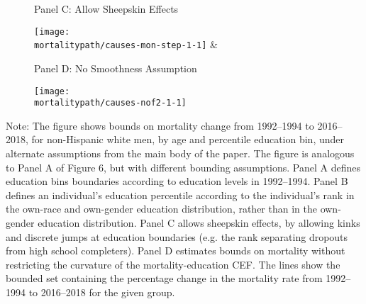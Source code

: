 \documentclass[12pt,letterpaper]{article}
\begin{document}
\begin{figure}[H]
  \begin{center}
    \vspace{-.6cm}
    Panel C: Allow Sheepskin Effects
  \end{center}
  \begin{center}
    \texttt{[image: \\mortalitypath/causes-mon-step-1-1]} &
  \end{center}
  \begin{center}
    \vspace{-.6cm}
    Panel D: No Smoothness Assumption
  \end{center}
  \begin{center}
    \texttt{[image: \\mortalitypath/causes-nof2-1-1]} \\
  \end{center}
\end{figure}
\vspace{-1cm}
\tiny{Note: The figure shows bounds on mortality change from 1992--1994 to 2016--2018, for non-Hispanic white men, by age and percentile education bin, under alternate assumptions from the main body of the paper. The figure is analogous to Panel A of Figure 6, but with different bounding assumptions. Panel A defines education bins boundaries according to education levels in 1992--1994. Panel B defines an individual's education percentile according to the individual's rank in the own-race and own-gender education distribution, rather than in the own-gender education distribution. Panel C allows sheepskin effects, by allowing kinks and discrete jumps at education boundaries (e.g. the rank separating dropouts from high school completers). Panel D estimates bounds on mortality without restricting the curvature of the mortality-education CEF.  The lines show the bounded set containing the percentage change in the mortality rate from 1992--1994 to 2016--2018 for the given group.}
\end{document}
